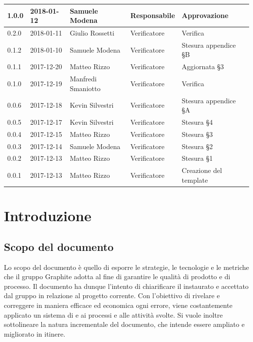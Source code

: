 \documentclass[openany,12pt,a4paper]{report}
\begin{document}
\begin{longtable}{|p{20mm}|p{20mm}|p{40mm}|p{30mm}|p{50mm}|}
		\hline
		 
		1.0.0 & 2018-01-12 & Samuele Modena & Responsabile & Approvazione \\
		\hline 0.2.0 & 2018-01-11 & Giulio Rossetti & Verificatore & Verifica \\
		\hline 0.1.2 & 2018-01-10 & Samuele Modena & Verificatore & Stesura appendice §B \\
		\hline 0.1.1 & 2017-12-20 & Matteo Rizzo & Verificatore & Aggiornata §3 \\
		\hline 0.1.0 & 2017-12-19 & Manfredi Smaniotto & Verificatore & Verifica \\		
		\hline 0.0.6 & 2017-12-18 & Kevin Silvestri & Verificatore & Stesura appendice §A \\
		\hline 0.0.5 & 2017-12-17 & Kevin Silvestri & Verificatore & Stesura §4 \\	
		\hline 0.0.4 & 2017-12-15 & Matteo Rizzo & Verificatore & Stesura §3 \\
		\hline 0.0.3 & 2017-12-14 & Samuele Modena & Verificatore & Stesura §2 \\
		\hline 0.0.2 & 2017-12-13 & Matteo Rizzo & Verificatore & Stesura §1 \\
		\hline 0.0.1 & 2017-12-13 & Matteo Rizzo & Verificatore & Creazione del template \\
		\hline
		
	\end{longtable}


\tableofcontents


\chapter{Introduzione}

    \section{Scopo del documento}
    
    Lo scopo del documento è quello di esporre le strategie, le tecnologie e le metriche che il gruppo Graphite adotta al fine di garantire le qualità di prodotto e di processo. Il documento ha dunque l'intento di chiarificare il  instaurato e accettato dal gruppo in relazione al progetto corrente. Con l'obiettivo di rivelare e correggere in maniera efficace ed economica ogni errore, viene costantemente applicato un sistema di  e  ai processi e alle attività svolte. Si vuole inoltre sottolineare la natura incrementale del documento, che intende essere ampliato e migliorato in itinere.
    
\end{document}

